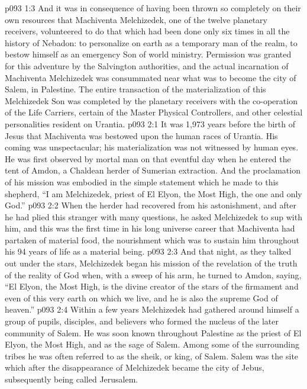 \vs p093 1:3 And it was in consequence of having been thrown so completely on their own resources that Machiventa Melchizedek, one of the twelve planetary receivers, volunteered to do that which had been done only six times in all the history of Nebadon: to personalize on earth as a temporary man of the realm, to bestow himself as an emergency Son of world ministry. Permission was granted for this adventure by the Salvington authorities, and the actual incarnation of Machiventa Melchizedek was consummated near what was to become the city of Salem, in Palestine. The entire transaction of the materialization of this Melchizedek Son was completed by the planetary receivers with the co\hyp{}operation of the Life Carriers, certain of the Master Physical Controllers, and other celestial personalities resident on Urantia.
\vs p093 2:1 It was 1,973 years before the birth of Jesus that Machiventa was bestowed upon the human races of Urantia. His coming was unspectacular; his materialization was not witnessed by human eyes. He was first observed by mortal man on that eventful day when he entered the tent of Amdon, a Chaldean herder of Sumerian extraction. And the proclamation of his mission was embodied in the simple statement which he made to this shepherd, “I am Melchizedek, priest of El Elyon, the Most High, the one and only God.”
\vs p093 2:2 When the herder had recovered from his astonishment, and after he had plied this stranger with many questions, he asked Melchizedek to sup with him, and this was the first time in his long universe career that Machiventa had partaken of material food, the nourishment which was to sustain him throughout his 94 years of life as a material being.
\vs p093 2:3 And that night, as they talked out under the stars, Melchizedek began his mission of the revelation of the truth of the reality of God when, with a sweep of his arm, he turned to Amdon, saying, “El Elyon, the Most High, is the divine creator of the stars of the firmament and even of this very earth on which we live, and he is also the supreme God of heaven.”
\vs p093 2:4 \pc Within a few years Melchizedek had gathered around himself a group of pupils, disciples, and believers who formed the nucleus of the later community of Salem. He was soon known throughout Palestine as the priest of El Elyon, the Most High, and as the sage of Salem. Among some of the surrounding tribes he was often referred to as the sheik, or king, of Salem. Salem was the site which after the disappearance of Melchizedek became the city of Jebus, subsequently being called Jerusalem.
